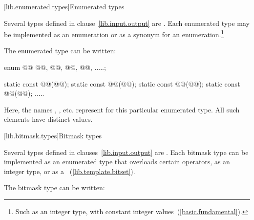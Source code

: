 [lib.enumerated.types]{Enumerated types}

\pnum
Several types defined in clause~\ref{lib.input.output} are
.
%
Each enumerated type may be implemented as an enumeration or as a synonym for
an enumeration.\footnote{Such as an integer type, with constant integer
values~(\ref{basic.fundamental}).}

\pnum
The enumerated type  can be written:

\begin{codeblock}
enum @@ { @@, @@, @@, @@, .....};

static const @@(@@);
static const @@(@@);
static const @@(@@);
static const @@(@@);
  .....
\end{codeblock}

\pnum
Here, the names , , etc. represent
for this particular enumerated type.
%
All such elements have distinct values.

[lib.bitmask.types]{Bitmask types}

\pnum
Several types defined in clauses~\ref{lib.input.output}
are
.
%
Each bitmask type can be implemented as an
enumerated type that overloads certain operators, as an integer type,
or as a
~(\ref{lib.template.bitset}).
%

\pnum
The bitmask type  can be written:

